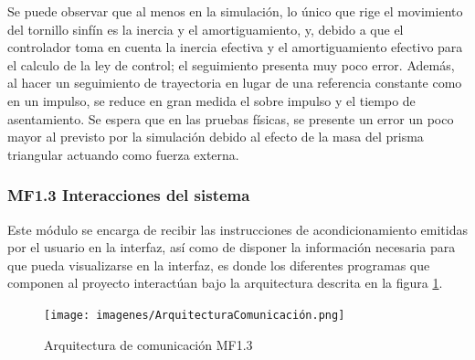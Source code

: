 Se puede observar que al menos en la simulación, lo único que rige el movimiento del tornillo sinfín es la inercia y el amortiguamiento, y, debido a que el controlador toma en cuenta la inercia efectiva y el amortiguamiento efectivo para el calculo de la ley de control; el seguimiento presenta muy poco error. Además, al hacer un seguimiento de trayectoria en lugar de una referencia constante como en un impulso, se reduce en gran medida el sobre impulso y el tiempo de asentamiento. Se espera que en las pruebas físicas, se presente un error un poco mayor al previsto por la simulación debido al efecto de la masa del prisma triangular actuando como fuerza externa. \\

\subsubsection{MF1.3 Interacciones del sistema}

Este módulo se encarga de recibir las instrucciones de acondicionamiento emitidas por el usuario en la interfaz, así como de disponer la información necesaria para que pueda visualizarse en la interfaz, es donde los diferentes programas que componen al proyecto interactúan bajo la arquitectura descrita en la figura \ref{fig:ArquitecturaComunicacion}.\\

\begin{figure}[h]
    \centering
    \texttt{[image: imagenes/ArquitecturaComunicación.png]}
    \caption{Arquitectura de comunicación MF1.3}
    \label{fig:ArquitecturaComunicacion}
\end{figure}

